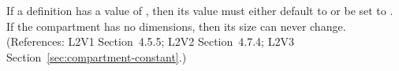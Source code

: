 If a \Compartment definition has a  value of
, then its   value must either default to or be
set to .  If the compartment has no dimensions, then its size can
never change.  (References: L2V1 Section~4.5.5; L2V2 Section~4.7.4; L2V3
Section~\ref{sec:compartment-constant}.)
